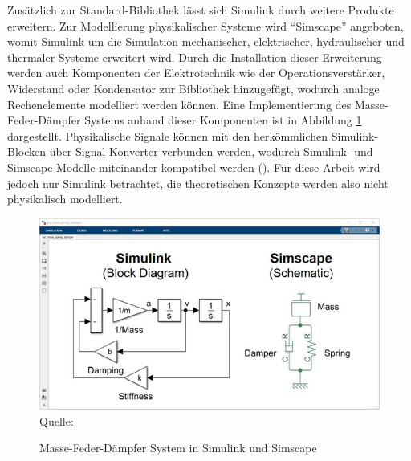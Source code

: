 Zusätzlich zur Standard-Bibliothek lässt sich Simulink durch weitere Produkte erweitern. Zur Modellierung physikalischer Systeme wird \zb "`Simscape"' angeboten, womit Simulink um die Simulation mechanischer, elektrischer, hydraulischer und thermaler Systeme erweitert wird. Durch die Installation dieser Erweiterung werden auch Komponenten der Elektrotechnik wie der Operationsverstärker, Widerstand oder Kondensator zur Bibliothek hinzugefügt, wodurch analoge Rechenelemente modelliert werden können. Eine Implementierung des Masse-Feder-Dämpfer Systems anhand dieser Komponenten ist in Abbildung \ref{fig:Simulink und Simscape} dargestellt. Physikalische Signale können mit den herkömmlichen Simulink-Blöcken über Signal-Konverter verbunden werden, wodurch Simulink- und Simscape-Modelle miteinander kompatibel werden (\cite{MathWorksSimscape}). Für diese Arbeit wird jedoch nur Simulink betrachtet, die theoretischen Konzepte werden also nicht physikalisch modelliert.

\begin{figure}[h]
  \caption{Masse-Feder-Dämpfer System in Simulink und Simscape}
  \includegraphics[width=\textwidth]{abbildungen/simulink_simscape.jpg}
  \\
  Quelle: \cite{MathWorksSimscape}
  \label{fig:Simulink und Simscape}
\end{figure}
